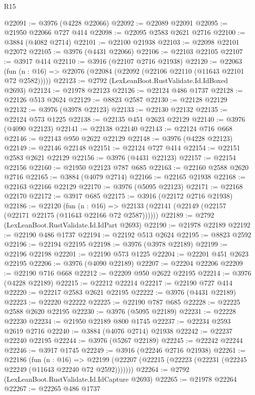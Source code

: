 \begin{lexlean}{R15}
\begin{coremodule}
@22091 := @3976 (@4228 @22066)
@22092 := @22089 @22091
@22095 := @21950 @22066 @727 @414
@22098 := @22095 @2583 @2621 @2716
@22100 := @3884 (@4082 @2714)
@22101 := @22100 @21938
@22103 := @22098 @22101 @22072
@22105 := @3976 (@4431 @22066)
@22106 := @22103 @22105
@22107 := @3917 @414
@22110 := @3916 (@22107 @2716 @21938)
@22120 := @22063
    (fun (n : @16) => @22076 (@22084 (@22092 (@22106 @22110 (@11643 @22101 @72 @2582)))))
@22123 := @2792 (LexLeanBoot.RustValidate.Id.IdBoxed @2693)
@22124 := @21978 @22123
@22126 := @22124 @486 @1737
@22128 := @22126 @513 @2624
@22129 := @8823 @2587
@22130 := @22128 @22129
@22132 := @3976 (@3978 @22123)
@22133 := @22130 @22132
@22135 := @22124 @573 @1225
@22138 := @22135 @451 @2623 @22129
@22140 := @3976 (@4090 @22123)
@22141 := @22138 @22140
@22143 := @22124 @716 @668
@22146 := @22143 @950 @2622 @22129
@22148 := @3976 (@4228 @22123)
@22149 := @22146 @22148
@22151 := @22124 @727 @414
@22154 := @22151 @2583 @2621 @22129
@22156 := @3976 (@4431 @22123)
@22157 := @22154 @22156
@22160 := @21950 @22123 @787 @685
@22163 := @22160 @2588 @2620 @2716
@22165 := @3884 (@4079 @2714)
@22166 := @22165 @21938
@22168 := @22163 @22166 @22129
@22170 := @3976 (@5095 @22123)
@22171 := @22168 @22170
@22172 := @3917 @685
@22175 := @3916 (@22172 @2716 @21938)
@22186 := @22120
    (fun (n : @16) => @22133 (@22141 (@22149 (@22157 (@22171 @22175 (@11643 @22166 @72 @2587))))))
@22189 := @2792 (LexLeanBoot.RustValidate.Id.IdPart @2693)
@22190 := @21978 @22189
@22192 := @22190 @486 @1737
@22194 := @22192 @513 @2624
@22195 := @8823 @2592
@22196 := @22194 @22195
@22198 := @3976 (@3978 @22189)
@22199 := @22196 @22198
@22201 := @22190 @573 @1225
@22204 := @22201 @451 @2623 @22195
@22206 := @3976 (@4090 @22189)
@22207 := @22204 @22206
@22209 := @22190 @716 @668
@22212 := @22209 @950 @2622 @22195
@22214 := @3976 (@4228 @22189)
@22215 := @22212 @22214
@22217 := @22190 @727 @414
@22220 := @22217 @2583 @2621 @22195
@22222 := @3976 (@4431 @22189)
@22223 := @22220 @22222
@22225 := @22190 @787 @685
@22228 := @22225 @2588 @2620 @22195
@22230 := @3976 (@5095 @22189)
@22231 := @22228 @22230
@22234 := @21950 @22189 @800 @1745
@22237 := @22234 @2593 @2619 @2716
@22240 := @3884 (@4076 @2714) @21938
@22242 := @22237 @22240 @22195
@22244 := @3976 (@5267 @22189)
@22245 := @22242 @22244
@22246 := @3917 @1745
@22249 := @3916 (@22246 @2716 @21938)
@22261 := @22186
    (fun (n : @16) =>
    @22199 (@22207 (@22215 (@22223 (@22231 (@22245 @22249 (@11643 @22240 @72 @2592)))))))
@22264 := @2792 (LexLeanBoot.RustValidate.Id.IdCapture @2693)
@22265 := @21978 @22264
@22267 := @22265 @486 @1737

\end{coremodule}
\end{lexlean}
